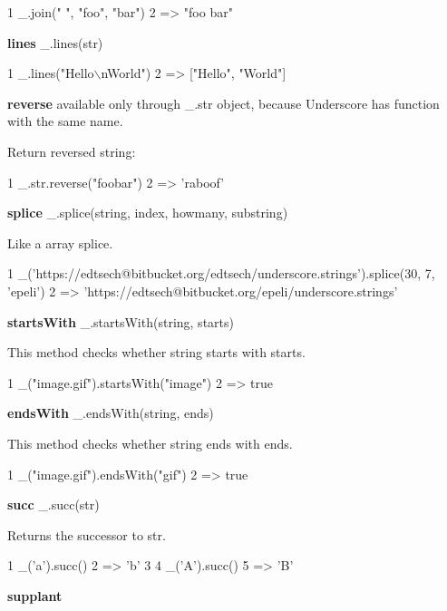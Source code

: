 \begin{DoxyCode}
1 \_.join(" ", "foo", "bar")
2 => "foo bar"
\end{DoxyCode}


{\bfseries lines} \+\_\+.\+lines(str)


\begin{DoxyCode}
1 \_.lines("Hello\(\backslash\)nWorld")
2 => ["Hello", "World"]
\end{DoxyCode}


{\bfseries reverse} available only through \+\_\+.\+str object, because Underscore has function with the same name.

Return reversed string\+:


\begin{DoxyCode}
1 \_.str.reverse("foobar")
2 => 'raboof'
\end{DoxyCode}


{\bfseries splice} \+\_\+.\+splice(string, index, howmany, substring)

Like a array splice.


\begin{DoxyCode}
1 \_('https://edtsech@bitbucket.org/edtsech/underscore.strings').splice(30, 7, 'epeli')
2 => 'https://edtsech@bitbucket.org/epeli/underscore.strings'
\end{DoxyCode}


{\bfseries starts\+With} \+\_\+.\+starts\+With(string, starts)

This method checks whether string starts with starts.


\begin{DoxyCode}
1 \_("image.gif").startsWith("image")
2 => true
\end{DoxyCode}


{\bfseries ends\+With} \+\_\+.\+ends\+With(string, ends)

This method checks whether string ends with ends.


\begin{DoxyCode}
1 \_("image.gif").endsWith("gif")
2 => true
\end{DoxyCode}


{\bfseries succ} \+\_\+.\+succ(str)

Returns the successor to str.


\begin{DoxyCode}
1 \_('a').succ()
2 => 'b'
3 
4 \_('A').succ()
5 => 'B'
\end{DoxyCode}


{\bfseries supplant}

